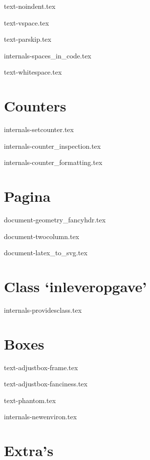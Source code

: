 \documentclass{cursuspresentatie}
\def\importslide#1#2{%
    {#2}
}
\begin{document}
    \importslide{text}{text-noindent.tex}

    \importslide{text}{text-vspace.tex}

    \importslide{text}{text-parskip.tex}

    \importslide{internals}{internals-spaces_in_code.tex}

	\importslide{text}{text-whitespace.tex}

    \section{Counters}

    \importslide{internals}{internals-setcounter.tex}

    \importslide{internals}{internals-counter_inspection.tex}

    \importslide{internals}{internals-counter_formatting.tex}

    \section{Pagina}

    \importslide{document}{document-geometry_fancyhdr.tex}

    \importslide{document}{document-twocolumn.tex}

    \importslide{document}{document-latex_to_svg.tex}

    \section{Class `inleveropgave'}

    \importslide{internals}{internals-providesclass.tex}

    \section{Boxes}
    \importslide{text}{text-adjustbox-frame.tex}

    \importslide{text}{text-adjustbox-fanciness.tex}

    \importslide{text}{text-phantom.tex}

    \importslide{internals}{internals-newenviron.tex}
    
    \section{Extra's}

\end{document}
